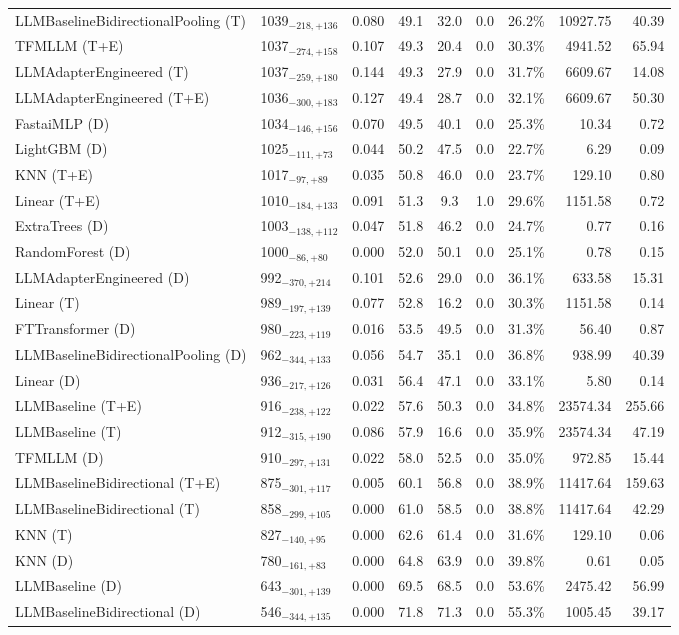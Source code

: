 \begin{tabular}{llcccccrr}
LLMBaselineBidirectionalPooling (T) & 1039${}_{-218,+136}$ & 0.080 & 49.1 & 32.0 & 0.0 & 26.2\% & 10927.75 & 40.39 \\
TFMLLM (T+E) & 1037${}_{-274,+158}$ & 0.107 & 49.3 & 20.4 & 0.0 & 30.3\% & 4941.52 & 65.94 \\
LLMAdapterEngineered (T) & 1037${}_{-259,+180}$ & 0.144 & 49.3 & 27.9 & 0.0 & 31.7\% & 6609.67 & 14.08 \\
LLMAdapterEngineered (T+E) & 1036${}_{-300,+183}$ & 0.127 & 49.4 & 28.7 & 0.0 & 32.1\% & 6609.67 & 50.30 \\
FastaiMLP (D) & 1034${}_{-146,+156}$ & 0.070 & 49.5 & 40.1 & 0.0 & 25.3\% & 10.34 & 0.72 \\
LightGBM (D) & 1025${}_{-111,+73}$ & 0.044 & 50.2 & 47.5 & 0.0 & 22.7\% & 6.29 & 0.09 \\
KNN (T+E) & 1017${}_{-97,+89}$ & 0.035 & 50.8 & 46.0 & 0.0 & 23.7\% & 129.10 & 0.80 \\
Linear (T+E) & 1010${}_{-184,+133}$ & 0.091 & 51.3 & 9.3 & 1.0 & 29.6\% & 1151.58 & 0.72 \\
ExtraTrees (D) & 1003${}_{-138,+112}$ & 0.047 & 51.8 & 46.2 & 0.0 & 24.7\% & 0.77 & 0.16 \\
RandomForest (D) & 1000${}_{-86,+80}$ & 0.000 & 52.0 & 50.1 & 0.0 & 25.1\% & 0.78 & 0.15 \\
LLMAdapterEngineered (D) & 992${}_{-370,+214}$ & 0.101 & 52.6 & 29.0 & 0.0 & 36.1\% & 633.58 & 15.31 \\
Linear (T) & 989${}_{-197,+139}$ & 0.077 & 52.8 & 16.2 & 0.0 & 30.3\% & 1151.58 & 0.14 \\
FTTransformer (D) & 980${}_{-223,+119}$ & 0.016 & 53.5 & 49.5 & 0.0 & 31.3\% & 56.40 & 0.87 \\
LLMBaselineBidirectionalPooling (D) & 962${}_{-344,+133}$ & 0.056 & 54.7 & 35.1 & 0.0 & 36.8\% & 938.99 & 40.39 \\
Linear (D) & 936${}_{-217,+126}$ & 0.031 & 56.4 & 47.1 & 0.0 & 33.1\% & 5.80 & 0.14 \\
LLMBaseline (T+E) & 916${}_{-238,+122}$ & 0.022 & 57.6 & 50.3 & 0.0 & 34.8\% & 23574.34 & 255.66 \\
LLMBaseline (T) & 912${}_{-315,+190}$ & 0.086 & 57.9 & 16.6 & 0.0 & 35.9\% & 23574.34 & 47.19 \\
TFMLLM (D) & 910${}_{-297,+131}$ & 0.022 & 58.0 & 52.5 & 0.0 & 35.0\% & 972.85 & 15.44 \\
LLMBaselineBidirectional (T+E) & 875${}_{-301,+117}$ & 0.005 & 60.1 & 56.8 & 0.0 & 38.9\% & 11417.64 & 159.63 \\
LLMBaselineBidirectional (T) & 858${}_{-299,+105}$ & 0.000 & 61.0 & 58.5 & 0.0 & 38.8\% & 11417.64 & 42.29 \\
KNN (T) & 827${}_{-140,+95}$ & 0.000 & 62.6 & 61.4 & 0.0 & 31.6\% & 129.10 & 0.06 \\
KNN (D) & 780${}_{-161,+83}$ & 0.000 & 64.8 & 63.9 & 0.0 & 39.8\% & 0.61 & 0.05 \\
LLMBaseline (D) & 643${}_{-301,+139}$ & 0.000 & 69.5 & 68.5 & 0.0 & 53.6\% & 2475.42 & 56.99 \\
LLMBaselineBidirectional (D) & 546${}_{-344,+135}$ & 0.000 & 71.8 & 71.3 & 0.0 & 55.3\% & 1005.45 & 39.17 \\
\bottomrule
\end{tabular}